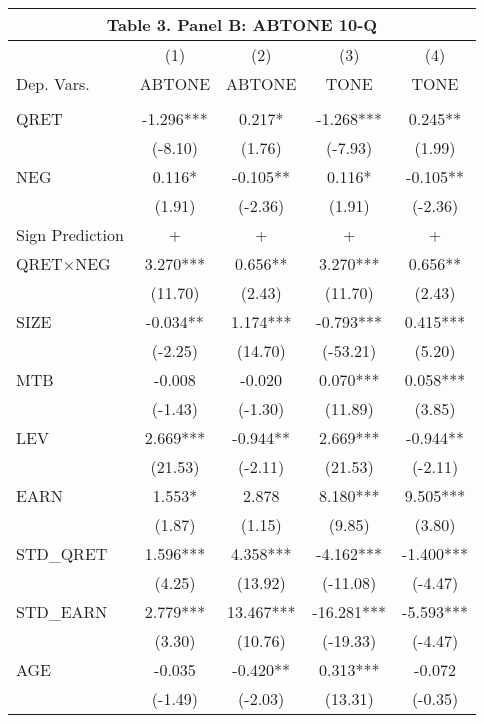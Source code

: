 \begin{table}[htbp] \label{T3PB}
  \centering
    \begin{tabular}{lcccc}
    \multicolumn{5}{c}{\textbf{Table 3. Panel B: ABTONE 10-Q}} \\
    \midrule
    \midrule
      & (1) & (2) & (3) & (4) \\
    Dep. Vars. & ABTONE & ABTONE & TONE & TONE \\
    \midrule
      &   &   &   &  \\
    QRET & -1.296*** & 0.217* & -1.268*** & 0.245** \\
      & (-8.10) & (1.76) & (-7.93) & (1.99) \\
    NEG & 0.116* & -0.105** & 0.116* & -0.105** \\
      & (1.91) & (-2.36) & (1.91) & (-2.36) \\
    \rowcolor[rgb]{ .933,  .925,  .882} Sign Prediction & + & + & + & + \\
    \rowcolor[rgb]{ .933,  .925,  .882} QRET$\times$NEG & 3.270*** & 0.656** & 3.270*** & 0.656** \\
    \rowcolor[rgb]{ .933,  .925,  .882}   & (11.70) & (2.43) & (11.70) & (2.43) \\
    SIZE & -0.034** & 1.174*** & -0.793*** & 0.415*** \\
      & (-2.25) & (14.70) & (-53.21) & (5.20) \\
    MTB & -0.008 & -0.020 & 0.070*** & 0.058*** \\
      & (-1.43) & (-1.30) & (11.89) & (3.85) \\
    LEV & 2.669*** & -0.944** & 2.669*** & -0.944** \\
      & (21.53) & (-2.11) & (21.53) & (-2.11) \\
    EARN & 1.553* & 2.878 & 8.180*** & 9.505*** \\
      & (1.87) & (1.15) & (9.85) & (3.80) \\
    STD\_QRET & 1.596*** & 4.358*** & -4.162*** & -1.400*** \\
      & (4.25) & (13.92) & (-11.08) & (-4.47) \\
    STD\_EARN & 2.779*** & 13.467*** & -16.281*** & -5.593*** \\
      & (3.30) & (10.76) & (-19.33) & (-4.47) \\
    AGE & -0.035 & -0.420** & 0.313*** & -0.072 \\
      & (-1.49) & (-2.03) & (13.31) & (-0.35) \\

\end{tabular}
\end{table}
